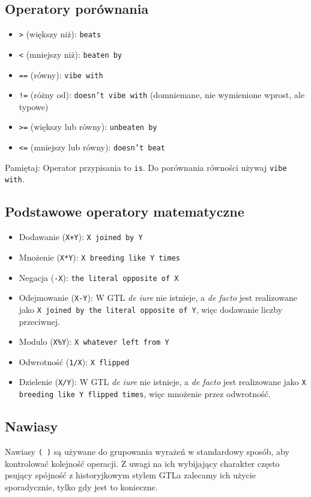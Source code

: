 \documentclass[12pt,a4paper]{article}
\begin{document}
\subsection{Operatory porównania}
\begin{itemize}
    \item \texttt{>} (większy niż): \texttt{beats}
    \item \texttt{<} (mniejszy niż): \texttt{beaten by}
    \item \texttt{==} (równy): \texttt{vibe with}
    \item \texttt{!=} (różny od): \texttt{doesn't vibe with} (domniemane, nie wymienione wprost, ale typowe)
    \item \texttt{>=} (większy lub równy): \texttt{unbeaten by}
    \item \texttt{<=} (mniejszy lub równy): \texttt{doesn't beat}
\end{itemize}
Pamiętaj: Operator przypisania to \texttt{is}. Do porównania równości używaj \texttt{vibe with}.

\subsection{Podstawowe operatory matematyczne}
\begin{itemize}
    \item Dodawanie (\texttt{X+Y}): \texttt{X joined by Y}
    \item Mnożenie (\texttt{X*Y}): \texttt{X breeding like Y times}
    \item Negacja (\texttt{-X}): \texttt{the literal opposite of X}
    \item Odejmowanie (\texttt{X-Y}): W GTL \textit{de iure} nie istnieje, a \textit{de facto} jest realizowane jako \texttt{X joined by the literal opposite of Y}, więc dodawanie liczby przeciwnej.
    \item Modulo (\texttt{X\%Y}): \texttt{X whatever left from Y}
    \item Odwrotność (\texttt{1/X}): \texttt{X flipped}
    \item Dzielenie (\texttt{X/Y}): W GTL \textit{de iure} nie istnieje, a \textit{de facto} jest realizowane jako \texttt{X breeding like Y flipped times}, więc mnożenie przez odwrotność.
\end{itemize}

\subsection{Nawiasy}
Nawiasy \texttt{( )} są używane do grupowania wyrażeń w standardowy sposób, aby kontrolować kolejność operacji. Z uwagi na ich wybijający charakter często psujący spójność z historyjkowym stylem GTLa zalecamy ich użycie sporadycznie, tylko gdy jest to konieczne.
\end{document}
